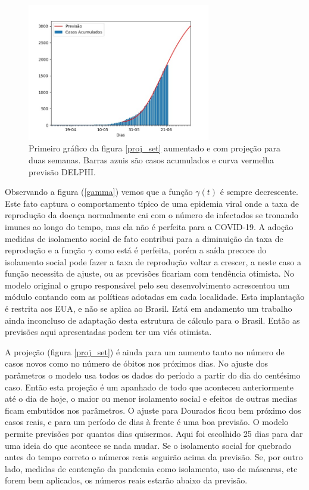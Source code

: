 \documentclass[12pt]{article}
\begin{document}
    \begin{figure}[!htb]
      \centering
      \includegraphics[width=8cm]{figs/Fig_Brasil_MS_Dourados_zoom_20200623.jpg}
      \caption{Primeiro gráfico da figura \ref{proj_set} aumentado e com projeção para duas semanas. Barras azuis são casos acumulados e curva vermelha previsão DELPHI.}
      \label{proj_zoo}
     \end{figure}


     Observando a figura (\ref{gamma}) vemos que a função $\gamma(t)$ é sempre decrescente. Este fato captura o comportamento típico de uma epidemia viral onde a taxa de reprodução da doença normalmente cai com o número de infectados se tronando imunes ao longo do tempo, mas ela não é perfeita para a COVID-19. A adoção medidas de isolamento social de fato contribui para a diminuição da taxa de reprodução e a função $\gamma$ como está é perfeita, porém a saída precoce do isolamento social pode fazer a taxa de reprodução voltar a crescer, a neste caso a função necessita de ajuste, ou as previsões ficariam com tendência otimista. No modelo original o grupo responsável pelo seu desenvolvimento acrescentou um módulo contando com as políticas adotadas em cada localidade. Esta implantação é restrita aos EUA, e não se aplica ao Brasil. Está em andamento um trabalho ainda inconcluso de adaptação desta estrutura de cálculo para o Brasil. Então as previsões aqui apresentadas podem ter um viés otimista.

A projeção (figura \ref{proj_set}) é ainda para um aumento tanto no número de casos novos como no número de óbitos nos próximos dias. No ajuste dos parâmetros o modelo usa todos os dados do período a partir do dia do centésimo caso. Então esta projeção é um apanhado de todo que aconteceu anteriormente até o dia de hoje, o maior ou menor isolamento social e efeitos de outras medias ficam embutidos nos parâmetros. O ajuste para Dourados ficou bem próximo dos casos reais, e para um período de dias à frente é uma boa previsão. O modelo permite previsões por quantos dias quisermos. Aqui foi escolhido 25 dias para dar uma ideia do que acontece se nada mudar. Se o isolamento social for quebrado antes do tempo correto o números reais seguirão acima da previsão. Se, por outro lado, medidas de contenção da pandemia como isolamento, uso de máscaras, etc forem bem aplicados, os números reais estarão abaixo da previsão.
\end{document}
